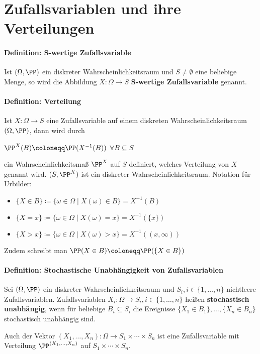 \section{Zufallsvariablen und ihre Verteilungen}
\paragraph{Definition: $\boldsymbol{S}$-wertige Zufallsvariable}
Ist $(\Omega,\PP)$ ein diskreter Wahrscheinlichkeitsraum und $S\neq\emptyset$ eine beliebige Menge, so wird die Abbildung $X:\Omega\rightarrow S$ $\boldsymbol{S}$\textbf{-wertige Zufallsvariable} genannt.

\paragraph{Definition: Verteilung}
Ist $X:\Omega\rightarrow S$ eine Zufallsvariable auf einem diskreten Wahrscheinlichkeitsraum $(\Omega,\PP)$, dann wird durch
\begin{tightcenter}
	$\PP^X(B)\coloneqq\PP(X^{-1}(B))$ \qquad$\forall B\subseteq S$
\end{tightcenter}
ein Wahrscheinlichkeitsmaß $\PP^X$ auf $S$ definiert, welches Verteilung von $X$ genannt wird.
$(S,\PP^X)$ ist ein diskreter Wahrscheinlichkeitsraum.
Notation für Urbilder:
\begin{itemize}
	\item $\{X\in B\}\coloneqq \{\omega\in\Omega\mid X(\omega)\in B\}=X^{-1}(B)$
	\item $\{X=x\}\coloneqq \{\omega\in\Omega\mid X(\omega)=x\}=X^{-1}(\{x\})$
	\item $\{X>x\}\coloneqq \{\omega\in\Omega\mid X(\omega)>x\}=X^{-1}((x,\infty))$
\end{itemize}
Zudem schreibt man $\PP(X\in B)\coloneqq \PP(\{X\in B\})$

\paragraph{Definition: Stochastische Unabhängigkeit von Zufallsvariablen}
Sei $(\Omega,\PP)$ ein diskreter Wahrscheinlichkeitsraum und $S_i,i\in\{1,\ldots,n\}$ nichtleere Zufallsvariablen.
Zufallsvariablen $X_i:\Omega\rightarrow S_i, i\in\{1,\ldots,n\}$ heißen \textbf{stochastisch unabhängig}, wenn für beliebige $B_i\subseteq S_i$ die Ereignisse $\{X_1\in B_1\},\ldots,\{X_n\in B_n\}$ stochastisch unabhängig sind.

Auch der Vektor $(X_1,\ldots,X_n):\Omega\rightarrow S_1\times\cdots\times S_n$ ist eine Zufallsvariable mit Verteilung $\PP^{(X_1,\ldots,X_n)}$ auf $S_1\times\cdots\times S_n$.

